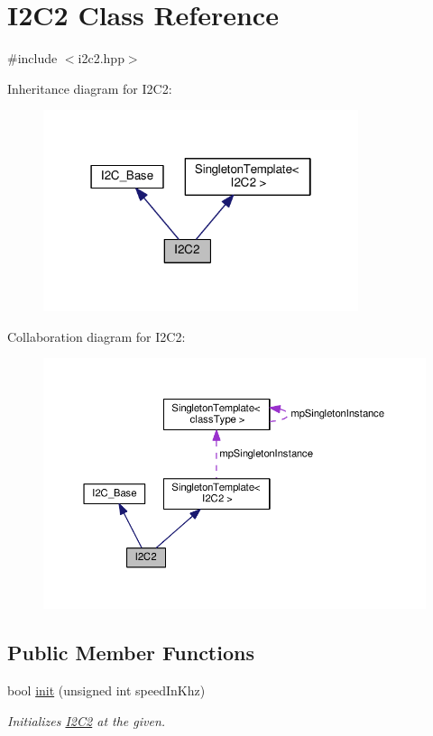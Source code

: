 \hypertarget{classI2C2}{}\section{I2\+C2 Class Reference}
\label{classI2C2}


{\ttfamily \#include $<$i2c2.\+hpp$>$}



Inheritance diagram for I2\+C2\+:\nopagebreak
\begin{figure}[H]
\begin{center}
\leavevmode
\includegraphics[width=262pt]{d7/da0/classI2C2__inherit__graph}
\end{center}
\end{figure}


Collaboration diagram for I2\+C2\+:\nopagebreak
\begin{figure}[H]
\begin{center}
\leavevmode
\includegraphics[width=350pt]{d7/d0f/classI2C2__coll__graph}
\end{center}
\end{figure}
\subsection*{Public Member Functions}
\begin{DoxyCompactItemize}
\item 
bool \hyperlink{classI2C2_ad7f9e3bb40e4d96b65e8d09fdcfbe46c}{init} (unsigned int speed\+In\+Khz)
\begin{DoxyCompactList}\small\item\em Initializes \hyperlink{classI2C2}{I2\+C2} at the given. \end{DoxyCompactList}\end{DoxyCompactItemize}
